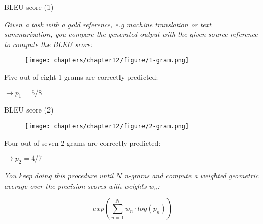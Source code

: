 
\begin{vbframe}{BLEU score (1)}

\textit{Given a task with a gold reference, e.g machine translation or text summarization, you compare the generated output with the given source reference to compute the BLEU score:}

\hspace{}

\begin{figure}
    \centering
    \texttt{[image: chapters/chapter12/figure/1-gram.png]}
    \label{fig:enter-label}
\end{figure}

\hspace{}

Five out of eight 1-grams are correctly predicted:

\hspace{}

$\rightarrow p_1 = 5/8$

\vfill
    
\end{vbframe}


\begin{vbframe}{BLEU score (2)}

\begin{figure}
    \centering
    \texttt{[image: chapters/chapter12/figure/2-gram.png]}
    \label{fig:enter-label}
\end{figure}

\hspace{}

Four out of seven 2-grams are correctly predicted:

\hspace{}

$\rightarrow p_2 = 4/7$

\hspace{}

\textit{You keep doing this procedure until $N$ n-grams and compute a weighted geometric average over the precision scores with weights $w_n$:}

$$exp\left(\sum_{n=1}^{N}w_n\cdot log(p_n)\right)$$
    
\end{vbframe}


